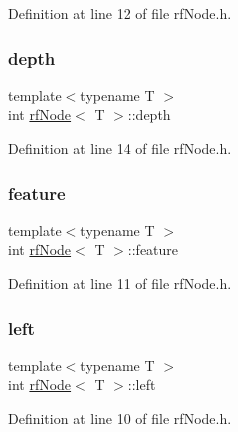 Definition at line 12 of file rf\+Node.\+h.

\mbox{\label{classrfNode_a7cb8fb854d8ec90635bd7207d8b8c31e}} 
\subsubsection{\texorpdfstring{depth}{depth}}
{\footnotesize\ttfamily template$<$typename T $>$ \\
int \hyperlink{classrfNode}{rf\+Node}$<$ T $>$\+::depth\hspace{0.3cm}{\ttfamily [protected]}}



Definition at line 14 of file rf\+Node.\+h.

\mbox{\label{classrfNode_ac8c0dd14a4e53f9b831f326f5d197e0e}} 
\subsubsection{\texorpdfstring{feature}{feature}}
{\footnotesize\ttfamily template$<$typename T $>$ \\
int \hyperlink{classrfNode}{rf\+Node}$<$ T $>$\+::feature\hspace{0.3cm}{\ttfamily [protected]}}



Definition at line 11 of file rf\+Node.\+h.

\mbox{\label{classrfNode_ac8e195fc3d8a9647f10a42153d76119f}} 
\subsubsection{\texorpdfstring{left}{left}}
{\footnotesize\ttfamily template$<$typename T $>$ \\
int \hyperlink{classrfNode}{rf\+Node}$<$ T $>$\+::left\hspace{0.3cm}{\ttfamily [protected]}}



Definition at line 10 of file rf\+Node.\+h.

\mbox{\label{classrfNode_a01e57d43ac8af60d16880544e99ed965}} 
